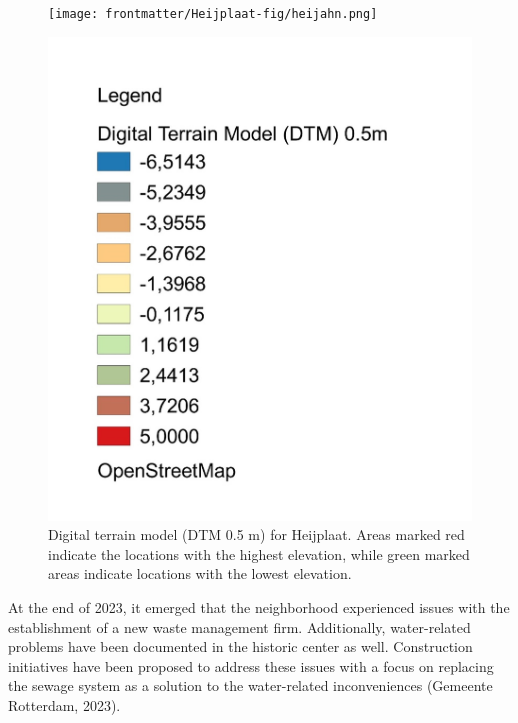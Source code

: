 \begin{figure}[htbp]
    \centering
    \begin{minipage}{0.60\linewidth}
        \texttt{[image: frontmatter/Heijplaat-fig/heijahn.png]}
        \caption{Digital terrain model (DTM 0.5 m) for Heijplaat. Areas marked red indicate the locations with the highest elevation, while green marked areas indicate locations with the lowest elevation. }
        \label{ahnheij}
    \end{minipage}\hfill
    \begin{minipage}{0.30\linewidth}
        \includegraphics[width=\linewidth]{legendoff.jpg}
    \end{minipage}
\end{figure}
\newpage
At the end of 2023, it emerged that the neighborhood experienced issues with the establishment of a new waste management firm. Additionally, water-related problems have been documented in the historic center as well. Construction initiatives have been proposed to address these issues with a focus on replacing the sewage system as a solution to the water-related inconveniences (Gemeente Rotterdam, 2023). 

